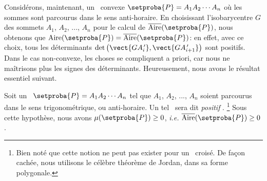 

Considérons, maintenant, un \ngone\ convexe $\setproba{P} = A_1 A_2 \cdots A_n$ où les sommes sont parcourus dans le sens anti-horaire.
En choisissant l'isobarycentre $G$ des sommets $A_1$, $A_2$, ..., $A_n$ pour le calcul de $\sarea{\setproba{P}}$, nous obtenons que $\area{\setproba{P}} = \sarea{\setproba{P}}$:
en effet,
avec ce choix, tous les déterminants $\det \big( \vect{G A^{\,\prime}_i} , \vect{G A^{\,\prime}_{i+1}} \big)$ sont positifs.
Dans le cas non-convexe, les choses se compliquent a priori, car nous ne maîtrisons plus les signes des déterminants. Heureusement, nous avons le résultat essentiel suivant.


\begin{fact} \label{route-direction}
    Soit un \ngone\ $\setproba{P} = A_1 A_2 \cdots A_n$ tel que $A_1$, $A_2$, ..., $A_n$ soient parcourus dans le sens trigonométrique, ou anti-horaire.
    Un tel \ngone\ sera dit \og \emph{positif} \fg.%
    \footnote{
    	Bien noté que cette notion ne peut pas exister pour un \ngone\ croisé. De façon cachée, nous utilisons le célèbre théorème de Jordan, dans sa forme polygonale.
    }
    Sous cette hypothèse, nous avons 
    $\mu(\setproba{P}) \geq 0$,
    \emph{i.e.}
    $\sarea{\setproba{P}} \geq 0$.
\end{fact}


